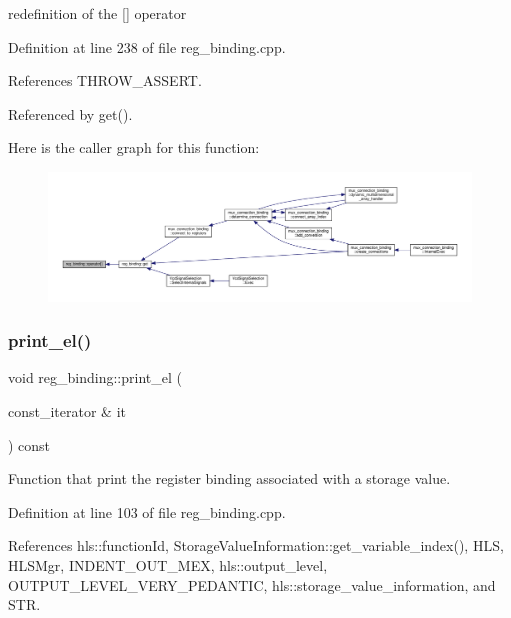 redefinition of the \mbox{[}\mbox{]} operator 



Definition at line 238 of file reg\+\_\+binding.\+cpp.



References T\+H\+R\+O\+W\+\_\+\+A\+S\+S\+E\+RT.



Referenced by get().

Here is the caller graph for this function\+:
\nopagebreak
\begin{figure}[H]
\begin{center}
\leavevmode
\includegraphics[width=350pt]{da/d7c/classreg__binding_a555a7ceaa089184a3d36a176d135378a_icgraph}
\end{center}
\end{figure}
\mbox{\label{classreg__binding_abcd4e3cda44712d54c47301cc5fedfb0}} 
\subsubsection{\texorpdfstring{print\+\_\+el()}{print\_el()}}
{\footnotesize\ttfamily void reg\+\_\+binding\+::print\+\_\+el (\begin{DoxyParamCaption}\item[{const\+\_\+iterator \&}]{it }\end{DoxyParamCaption}) const}



Function that print the register binding associated with a storage value. 



Definition at line 103 of file reg\+\_\+binding.\+cpp.



References hls\+::function\+Id, Storage\+Value\+Information\+::get\+\_\+variable\+\_\+index(), H\+LS, H\+L\+S\+Mgr, I\+N\+D\+E\+N\+T\+\_\+\+O\+U\+T\+\_\+\+M\+EX, hls\+::output\+\_\+level, O\+U\+T\+P\+U\+T\+\_\+\+L\+E\+V\+E\+L\+\_\+\+V\+E\+R\+Y\+\_\+\+P\+E\+D\+A\+N\+T\+IC, hls\+::storage\+\_\+value\+\_\+information, and S\+TR.



